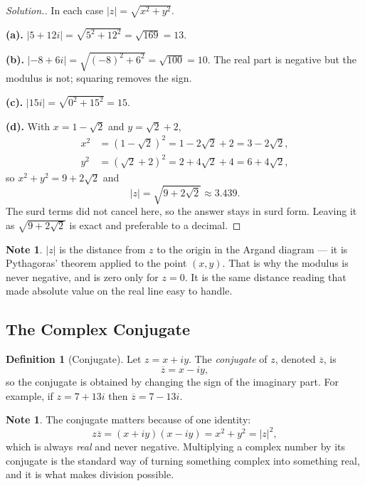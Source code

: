 \documentclass[11pt,a4paper]{article}
\theoremstyle{definition}
\newtheorem{definition}[thm]{Definition}
\newtheorem{note}[thm]{Note}
\newenvironment{solution}
  {\renewcommand{\qedsymbol}{}\begin{proof}[\textit{Solution}.]}
  {\end{proof}}
\begin{document}
\begin{solution}
In each case $\left|z\right|=\sqrt{x^{2}+y^{2}}$.

\textbf{(a).} $\left|5+12i\right|=\sqrt{5^{2}+12^{2}}=\sqrt{169}=13$.

\textbf{(b).} $\left|-8+6i\right|=\sqrt{(-8)^{2}+6^{2}}=\sqrt{100}=10$. The real
part is negative but the modulus is not; squaring removes the sign.

\textbf{(c).} $\left|15i\right|=\sqrt{0^{2}+15^{2}}=15$.

\textbf{(d).} With $x=1-\sqrt{2}$ and $y=\sqrt{2}+2$,
\begin{align*}
x^{2}&=\left(1-\sqrt{2}\right)^{2}=1-2\sqrt{2}+2=3-2\sqrt{2},\\
y^{2}&=\left(\sqrt{2}+2\right)^{2}=2+4\sqrt{2}+4=6+4\sqrt{2},
\end{align*}
so $x^{2}+y^{2}=9+2\sqrt{2}$ and
$$\left|z\right|=\sqrt{9+2\sqrt{2}}\approx 3.439 .$$
The surd terms did not cancel here, so the answer stays in surd form. Leaving it
as $\sqrt{9+2\sqrt{2}}$ is exact and preferable to a decimal.
\end{solution}

\begin{note}
$\left|z\right|$ is the distance from $z$ to the origin in the Argand diagram --- it
is Pythagoras' theorem applied to the point $(x,y)$. That is why the modulus is
never negative, and is zero only for $z=0$. It is the same distance reading that
made absolute value on the real line easy to handle.
\end{note}
\subsection{The Complex Conjugate}

\begin{definition}[Conjugate]
Let $z=x+iy$. The \emph{conjugate} of $z$, denoted $\overline{z}$, is
$$\overline{z}=x-iy,$$
so the conjugate is obtained by changing the sign of the imaginary part. For
example, if $z=7+13i$ then $\overline{z}=7-13i$.
\end{definition}

\begin{note}
The conjugate matters because of one identity:
$$z\overline{z}=(x+iy)(x-iy)=x^{2}+y^{2}=|z|^{2},$$
which is always \emph{real} and never negative. Multiplying a complex number by
its conjugate is the standard way of turning something complex into something
real, and it is what makes division possible.
\end{note}
\end{document}

